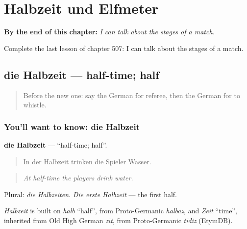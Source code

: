 
\chapter{Halbzeit und Elfmeter}
\label{ch:ge-halbzeit-und-elfmeter}

\begin{chapteropening}
\textbf{By the end of this chapter:} \emph{I can talk about the stages of a match.}

Complete the last lesson of chapter 507: I can talk about the stages of a match.
\end{chapteropening}

\section[die Halbzeit]{die Halbzeit — half-time; half}

\label{lesson:GE-C507-halbzeit}



\begin{quote}
Before the new one: say the German for referee, then the German for to whistle.
\end{quote}

\subsection*{You'll want to know: die Halbzeit}
\textbf{die Halbzeit} — \textquotedblleft{}half-time; half\textquotedblright{}.

\begin{quote}
In der Halbzeit trinken die Spieler Wasser.
\end{quote}

\begin{quote}
\emph{At half-time the players drink water.}
\end{quote}

Plural: \emph{die Halbzeiten}. \emph{Die erste Halbzeit} — the first half.

\begin{cousinweb}
\emph{Halbzeit} is built on \emph{halb} \textquotedblleft{}half\textquotedblright{}, from Proto-Germanic \emph{halbaz}, and \emph{Zeit} \textquotedblleft{}time\textquotedblright{}, inherited from Old High German \emph{zīt}, from Proto-Germanic \emph{tīdiz} (EtymDB).
\end{cousinweb}

